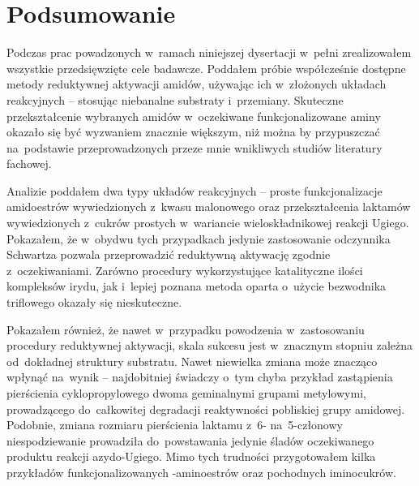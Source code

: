 \chapter{Podsumowanie}\label{chapter:conclusions}
Podczas prac powadzonych w~ramach niniejszej dysertacji w~pełni zrealizowałem wszystkie
  przedsięwzięte cele badawcze.
Poddałem próbie współcześnie dostępne metody reduktywnej aktywacji amidów,
  używając ich w~złożonych układach reakcyjnych \--- stosując niebanalne substraty i~przemiany.
Skuteczne przekształcenie wybranych amidów w~oczekiwane funkcjonalizowane aminy okazało się
  być wyzwaniem znacznie większym, niż można by przypuszczać na~podstawie przeprowadzonych
  przeze mnie wnikliwych studiów literatury fachowej.

Analizie poddałem dwa typy układów reakcyjnych \--- proste funkcjonalizacje amidoestrów
  wywiedzionych z~kwasu malonowego oraz przekształcenia laktamów wywiedzionych
  z~cukrów prostych w~wariancie wieloskładnikowej reakcji Ugiego.
Pokazałem, że w~obydwu tych przypadkach jedynie zastosowanie odczynnika Schwartza pozwala
  przeprowadzić reduktywną aktywację zgodnie z~oczekiwaniami.
Zarówno procedury wykorzystujące katalityczne ilości kompleksów irydu, jak i~lepiej poznana
  metoda oparta o~użycie bezwodnika triflowego okazały się nieskuteczne.

Pokazałem również, że nawet w~przypadku powodzenia w~zastosowaniu procedury reduktywnej aktywacji,
  skala sukcesu jest w~znacznym stopniu zależna od~dokładnej struktury substratu.
Nawet niewielka zmiana może znacząco wpłynąć na~wynik \--- najdobitniej świadczy o~tym chyba
  przykład zastąpienia pierścienia cyklopropylowego dwoma geminalnymi grupami metylowymi,
  prowadzącego do~całkowitej degradacji reaktywności pobliskiej grupy amidowej.
Podobnie, zmiana rozmiaru pierścienia laktamu z~6- na~5-członowy niespodziewanie prowadziła
  do~powstawania jedynie śladów oczekiwanego produktu reakcji azydo-Ugiego.
Mimo tych trudności przygotowałem kilka przykładów funkcjonalizowanych \textbeta-aminoestrów
  oraz pochodnych iminocukrów.

